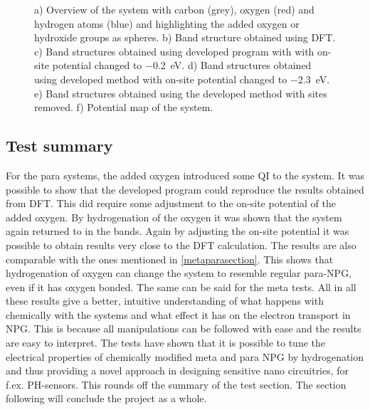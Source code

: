 \begin{figure}[H]
\begin{subfigure}[b]{0.8\textwidth}
		\vspace{-0.5\baselineskip}
		\caption{}
		\label{potmapMS2OH}
	\end{subfigure}
	\caption{a) Overview of the system with carbon (grey), oxygen (red) and hydrogen atoms (blue) and highlighting the added oxygen or hydroxide groups as spheres. b) Band structure obtained using DFT. c) Band structures obtained using developed program with with on-site potential changed to \SI{-0.2}{\electronvolt}. d) Band structures obtained using developed method with on-site potential changed to \SI{-2.3}{\electronvolt}. e) Band structures obtained using the developed method with sites removed. f) Potential map of the system.}
	\label{MS2OH}
\end{figure}
\subsection{Test summary}
For the para systems, the added oxygen introduced some QI to the system. It was possible to show that the developed program could reproduce the results obtained from DFT. This did require some adjustment to the on-site potential of the added oxygen. By hydrogenation of the oxygen it was shown that the system again returned to  in the bands. Again by adjusting the on-site potential it was possible to obtain results very close to the DFT calculation. The results are also comparable with the ones mentioned in \cref{metaparasection}. This shows that hydrogenation of oxygen can change the system to resemble regular para-NPG, even if it has oxygen bonded. The same can be said for the meta tests. All in all these results give a better, intuitive understanding of what happens with chemically with the systems and what effect it has on the electron transport in NPG. This is because all manipulations can be followed with ease and the results are easy to interpret. The tests have shown that it is possible to tune the electrical properties of chemically modified meta and para NPG by hydrogenation and thus providing a novel approach in designing sensitive nano circuitries, for f.ex. PH-sensors. This rounds off the summary of the test section. The section following will conclude the project as a whole.
